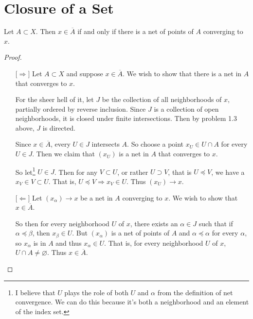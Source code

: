 \documentclass[12pt]{article}
\begin{document}
\section{Closure of a Set}
\begin{thm}
    Let $A \subset X$. Then $x \in \overline A$ if and only if there is a net of points of $A$
    converging to $x$.
\end{thm}
\begin{proof}
    \ \vspace{-0.5cm}\newline
    \begin{itemize}
        \item[$\lbrack\Rightarrow\rbrack$] Let $A \subset X$ and suppose $x \in \overline A$. We
              wish to show that there is a net in $A$ that converges to $x$.

              For the sheer hell of it, let $J$ be the collection of all neighborhoods of $x$,
              partially ordered by reverse inclusion. Since $J$ is a collection of open
              neighborhoods, it is closed under finite intersections. Then by problem 1.3 above,
              $J$ is directed.

              Since $x \in \overline A$, every $U \in J$ intersects $A$. So choose a point
              $x_U \in U \cap A$ for every $U \in J$. Then we claim that $(x_U)$ is a net in
              $A$ that converges to $x$.

              So let\footnote{I believe\texttrademark{} that $U$ plays the role of
                  both $U$ and $\alpha$ from the definition of net convergence. We can do this
                  because it's both a neighborhood and an element of the index set.}
              $U \in J$. Then for any $V \subset U$, or rather $U \supset V$, that is
              $U \preceq V$, we have a $x_V \in V \subset U$. That is,
              $U \preceq V \Rightarrow x_V \in U$. Thus $(x_U) \to x$.
        \item[$\lbrack\Leftarrow\rbrack$] Let $(x_\alpha) \to x$ be a net in $A$ converging to $x$.
              We wish to show that $x \in \overline A$.

              So then for every neighborhood $U$ of $x$, there exists an $\alpha \in J$ such that
              if $\alpha \preceq \beta$, then $x_\beta \in U$. But $(x_\alpha)$ is a net of points
              of $A$ and $\alpha \preceq \alpha$ for every $\alpha$, so $x_\alpha$ is in $A$ and
              thus $x_\alpha \in U$. That is, for every neighborhood $U$ of $x$,
              $U \cap A \neq \varnothing$. Thus $x \in \overline A$.
    \end{itemize}
\end{proof}
\end{document}

